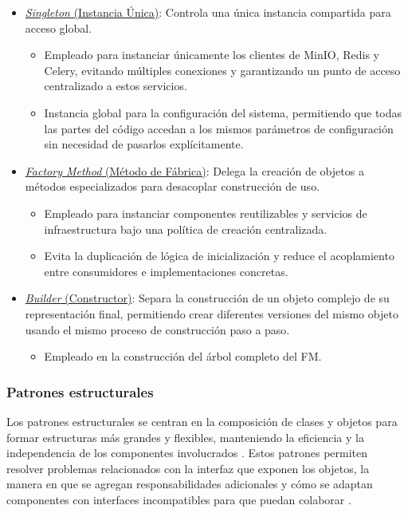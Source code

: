 \begin{itemize}
	\item \underline{\textit{Singleton} (Instancia Única)}: Controla una única instancia compartida para acceso global.
	\begin{itemize}
		\item Empleado para instanciar únicamente los clientes de MinIO, Redis y Celery, evitando múltiples conexiones y garantizando un punto de acceso centralizado a estos servicios.
		\item Instancia global para la configuración del sistema, permitiendo que todas las partes del código accedan a los mismos parámetros de configuración sin necesidad de pasarlos explícitamente.
	\end{itemize}
	\item \underline{\textit{Factory Method} (Método de Fábrica)}: Delega la creación de objetos a métodos especializados para desacoplar construcción de uso.
	\begin{itemize}
		\item Empleado para instanciar componentes reutilizables y servicios de infraestructura bajo una política de creación centralizada.
    	\item Evita la duplicación de lógica de inicialización y reduce el acoplamiento entre consumidores e implementaciones concretas.
	\end{itemize}  
	\item \underline{\textit{Builder} (Constructor)}: Separa la construcción de un objeto complejo de su representación final, permitiendo crear diferentes versiones del mismo objeto usando el mismo proceso de construcción paso a paso.
	\begin{itemize}
		\item Empleado en la construcción del árbol completo del \ac{FM}.
	\end{itemize}
\end{itemize}

\subsubsection{Patrones estructurales}

Los patrones estructurales se centran en la composición de clases y objetos para formar estructuras 
más grandes y flexibles, manteniendo la eficiencia y la independencia de los componentes 
involucrados \citep{gamma1995design}. Estos patrones permiten resolver problemas relacionados 
con la interfaz que exponen los objetos, la manera en que se agregan responsabilidades adicionales 
y cómo se adaptan componentes con interfaces incompatibles para que puedan colaborar 
\citep{refactoring2021patrones}.

